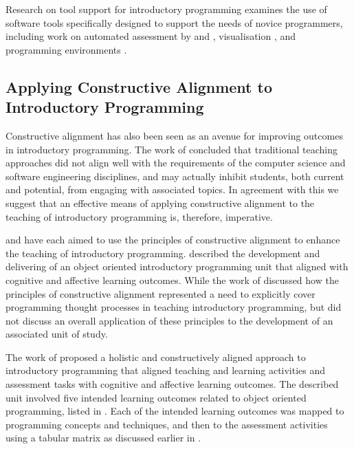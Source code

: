 Research on tool support for introductory programming examines the use of software tools specifically designed to support the needs of novice programmers, including work on automated assessment by \citet{AlaMutk:2007} and \citet{Douce:2005}, visualisation \cite{Naps:2002}, and programming environments \cite{Gross:2005,Kelleher:2005,Kolling:2003,Mason:2013}.


\subsection{Applying Constructive Alignment to Introductory Programming} %
\label{sub:applying_constructive_alignment_to_introductory_programming}

Constructive alignment has also been seen as an avenue for improving outcomes in introductory programming. The work of \citet{Armarego:2009} concluded that traditional teaching approaches did not align well with the requirements of the computer science and software engineering disciplines, and may actually inhibit students, both current and potential, from engaging with associated topics. In agreement with this we suggest that an effective means of applying constructive alignment to the teaching of introductory programming is, therefore, imperative. 

\citet{Thota:2010} and \citet{Gaspar:2012} have each aimed to use the principles of constructive alignment to enhance the teaching of introductory programming. \citet{Thota:2010} described the development and delivering of an object oriented introductory programming unit that aligned with cognitive and affective learning outcomes. While the work of \citet{Gaspar:2012} discussed how the principles of constructive alignment represented a need to explicitly cover programming thought processes in teaching introductory programming, but did not discuss an overall application of these principles to the development of an associated unit of study. 

The work of \citet{Thota:2010} proposed a holistic and constructively aligned approach to introductory programming that aligned teaching and learning activities and assessment tasks with cognitive and affective learning outcomes. The described unit involved five intended learning outcomes related to object oriented programming, listed in . Each of the intended learning outcomes was mapped to programming concepts and techniques, and then to the assessment activities using a tabular matrix as discussed earlier in .

